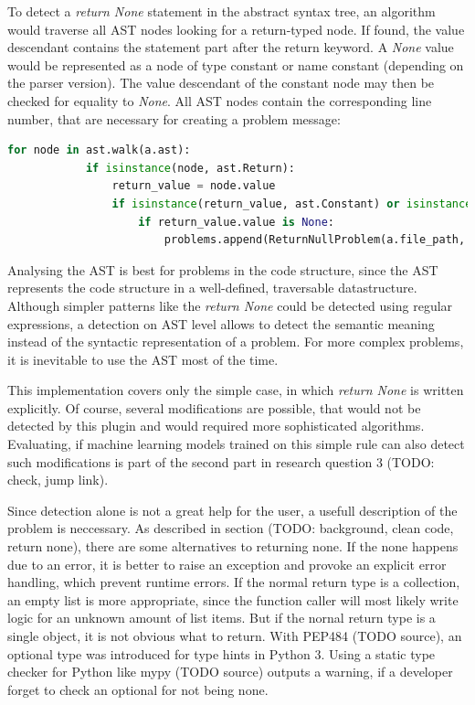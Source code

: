 \begin{description}
    To detect a \textit{return None} statement in the abstract syntax tree, an algorithm would traverse all AST nodes looking for a return-typed node. If found, the value descendant contains the statement part after the return keyword. A \textit{None} value would be represented as a node of type constant or name constant (depending on the parser version). The value descendant of the constant node may then be checked for equality to \textit{None}. All AST nodes contain the corresponding line number, that are necessary for creating a problem message:
    \begin{lstlisting}[language=Python]
        for node in ast.walk(a.ast):
            if isinstance(node, ast.Return):
                return_value = node.value
                if isinstance(return_value, ast.Constant) or isinstance(return_value, ast.NameConstant):
                    if return_value.value is None:
                        problems.append(ReturnNullProblem(a.file_path, return_value.lineno))
    \end{lstlisting}

    Analysing the AST is best for problems in the code structure, since the AST represents the code structure in a well-defined, traversable datastructure. Although simpler patterns like the \textit{return None} could be detected using regular expressions, a detection on AST level allows to detect the semantic meaning instead of the syntactic representation of a problem. For more complex problems, it is inevitable to use the AST most of the time.
\end{description}

This implementation covers only the simple case, in which \textit{return None} is written explicitly. Of course, several modifications are possible, that would not be detected by this plugin and would required more sophisticated algorithms. Evaluating, if machine learning models trained on this simple rule can also detect such modifications is part of the second part in research question 3 (TODO: check, jump link).

Since detection alone is not a great help for the user, a usefull description of the problem is neccessary. 
As described in section (TODO: background, clean code, return none), there are some alternatives to returning none. If the none happens due to an error, it is better to raise an exception and provoke an explicit error handling, which prevent runtime errors. If the normal return type is a collection, an empty list is more appropriate, since the function caller will most likely write logic for an unknown amount of list items. But if the nornal return type is a single object, it is not obvious what to return. With PEP484 (TODO source), an optional type was introduced for type hints in Python 3. Using a static type checker for Python like mypy (TODO source) outputs a warning, if a developer forget to check an optional for not being none. 

